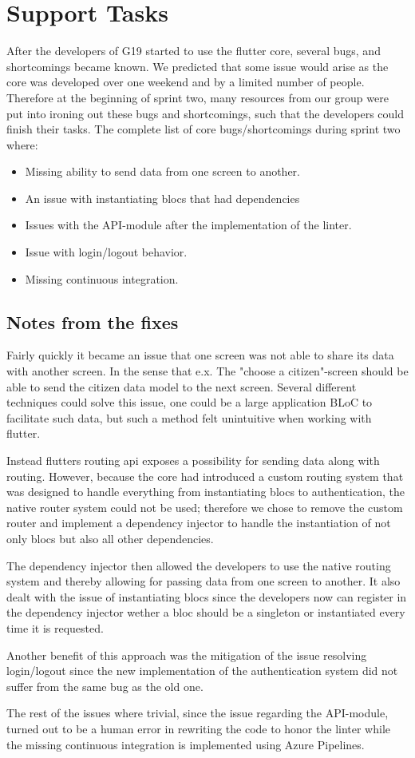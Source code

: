 \section{Support Tasks}
After the developers of \gls{G19} started to use the flutter core, several bugs, and shortcomings became known. We predicted that some issue would arise as the core was developed over one weekend and by a limited number of people. Therefore at the beginning of sprint two, many resources from our group were put into ironing out these bugs and shortcomings, such that the developers could finish their tasks. The complete list of core bugs/shortcomings during sprint two where:

\begin{itemize}
  \item Missing ability to send data from one screen to another.
  \item An issue with instantiating \glspl{bloc} that had dependencies
  \item Issues with the API-module after the implementation of the linter.
  \item Issue with login/logout behavior.
  \item Missing continuous integration.
\end{itemize}

\subsection{Notes from the fixes}
Fairly quickly it became an issue that one screen was not able to share its data with another screen. In the sense that e.x. The "choose a citizen"-screen should be able to send the citizen data model to the next screen. Several different techniques could solve this issue, one could be a large application BLoC to facilitate such data, but such a method felt unintuitive when working with flutter.

Instead flutters routing api exposes a possibility for sending data along with routing. However, because the core had introduced a custom routing system that was designed to handle everything from instantiating \glspl{bloc} to authentication, the native router system could not be used; therefore we chose to remove the custom router and implement a dependency injector to handle the instantiation of not only \glspl{bloc} but also all other dependencies.

The dependency injector then allowed the developers to use the native routing system and thereby allowing for passing data from one screen to another. It also dealt with the issue of instantiating \glspl{bloc} since the developers now can register in the dependency injector wether a \gls{bloc} should be a singleton or instantiated every time it is requested.

Another benefit of this approach was the mitigation of the issue resolving login/logout since the new implementation of the authentication system did not suffer from the same bug as the old one.

The rest of the issues where trivial, since the issue regarding the API-module, turned out to be a human error in rewriting the code to honor the linter while the missing continuous integration is implemented using Azure Pipelines.